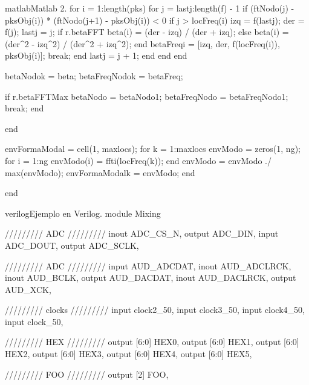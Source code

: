 \begin{sourcecode}{matlab}{Matlab 2.}
    for i = 1:length(pks)
        for j = lastj:length(f) - 1 %
            if (ftNodo(j) - pksObj(i)) * (ftNodo(j+1) - pksObj(i)) < 0 %
                if j > locFreq(i)
                    izq = f(lastj);
                    der = f(j);
                    lastj = j;
                    if r.betaFFT
                        beta(i) = (der - izq) / (der + izq);
                    else
                        beta(i) = (der^2 - izq^2) / (der^2 + izq^2);
                    end
                    betaFreq{i} = [izq, der, f(locFreq(i)), pksObj(i)];
                    break;
                end
                lastj = j + 1; %
            end
        end %
    end %
    
    betaNodo{k} = beta;
    betaFreqNodo{k} = betaFreq;
    
    if r.betaFFTMax
        betaNodo = betaNodo{1};
        betaFreqNodo = betaFreqNodo{1};
        break;
    end
    
end %

envFormaModal = cell(1, maxlocs);
for k = 1:maxlocs
    envModo = zeros(1, ng);
    for i = 1:ng %
        envModo(i) = fft{i}(locFreq(k));
    end %
    envModo = envModo ./ max(envModo);
    envFormaModal{k} = envModo;
end %

end %
\end{sourcecode}

\begin{sourcecode}{verilog}{Ejemplo en Verilog.}
module Mixing {
	///////// ADC /////////
	inout              ADC_CS_N,
	output             ADC_DIN,
	input              ADC_DOUT,
	output             ADC_SCLK,
	
	///////// ADC /////////
	input              AUD_ADCDAT,
	inout              AUD_ADCLRCK,
	inout              AUD_BCLK,
	output             AUD_DACDAT,
	inout              AUD_DACLRCK,
	output             AUD_XCK,
	
	///////// clocks /////////
	input              clock2_50,
	input              clock3_50,
	input              clock4_50,
	input              clock_50,
	
	///////// HEX /////////
	output      [6:0]  HEX0,
	output      [6:0]  HEX1,
	output      [6:0]  HEX2,
	output      [6:0]  HEX3,
	output      [6:0]  HEX4,
	output      [6:0]  HEX5,
	
	///////// FOO /////////
	output      [2]    FOO,
}
\end{sourcecode}

